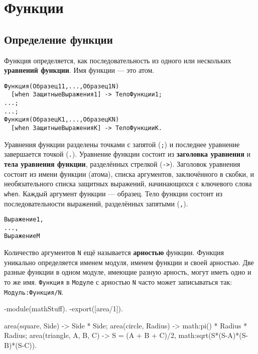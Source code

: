 \chapter{Функции}

\section{Определение функции}

Функция определяется, как последовательность из одного или нескольких  
\textbf{уравнений функции}. Имя функции --- это атом.

\vspace*{4pt}
\begin{verbatim}
Функция(Образец11,...,Образец1N)
  [when ЗащитныеВыражения1] -> ТелоФункции1;
...;
...;
Функция(ОбразецK1,...,ОбразецKN)
  [when ЗащитныеВыраженияK] -> ТелоФункцииK.

\end{verbatim}
\vspace*{4pt}

Уравнения функции разделены точками с запятой (\texttt{;}) и последнее уравнение
завершается точкой (\texttt{.}). Уравнение функции состоит из \textbf{заголовка
уравнения} и \textbf{тела уравнения функции}, разделённых стрелкой (\texttt{->}).
Заголовок уравнения состоит из имени функции (атома), списка аргументов, 
заключённого в скобки, и необязательного списка защитных выражений, начинающихся
с ключевого слова \texttt{when}.  Каждый аргумент функции --- образец.  Тело 
функции состоит из последовательности выражений, разделённых запятыми (\texttt{,}).

\vspace*{4pt}
\begin{verbatim}
Выражение1,
...,
ВыражениеM
\end{verbatim}
\vspace*{4pt}

Количество аргументов \texttt{N} ещё называется \textbf{арностью} функции.
Функция уникально определяется именем модуля, именем функции и своей арностью. 
Две разные функции в одном модуле, имеющие разную арность, могут иметь одно и то
же имя.  \texttt{Функция} в \texttt{Модуле} с арностью \texttt{N} часто может
записываться так: \texttt{Модуль:Функция/N}.

\vspace*{4pt}
\begin{erlang}
-module(mathStuff).
-export([area/1]).

area({square, Side}) -> Side * Side;
area({circle, Radius}) -> math:pi() * Radius * Radius;
area({triangle, A, B, C}) ->
    S = (A + B + C)/2,
    math:sqrt(S*(S-A)*(S-B)*(S-C)).
\end{erlang}

